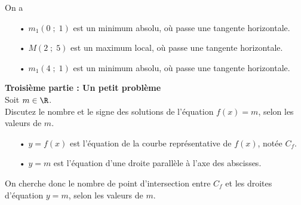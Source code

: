 On a \\

\begin{itemize}
\item[•] $m_1(0 \; ; \; 1)$ est un minimum absolu, où passe une tangente horizontale.
\item[•] $M(2 \; ; \; 5)$ est un maximum local, où passe une tangente horizontale.
\item[•] $m_1(4 \; ; \; 1)$ est un minimum absolu, où passe une tangente horizontale.
\end{itemize}

\newpage

\textbf{Troisième partie : Un petit problème} \\

Soit $m \in \R$. \\

Discutez le nombre et le signe des solutions de l'équation $f(x) = m$, selon les valeurs de $m$. \\

\begin{itemize}
\item[•] $y = f(x)$ est l'équation de la courbe représentative de $f(x)$, notée $C_f$. \\
\item[•] $y = m$ est l'équation d'une droite parallèle à l'axe des abscisses. \\
\end{itemize}

On cherche donc le nombre de point d'intersection entre $C_f$ et les droites d'équation $y = m$, selon les valeurs de $m$. \\

